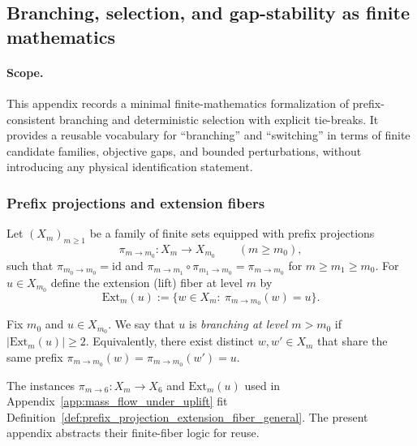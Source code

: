 \subsection{Branching, selection, and gap-stability as finite mathematics}
\label{app:branching_selection_rigidity}

\paragraph{Scope.}
\MathTag This appendix records a minimal finite-mathematics formalization of
prefix-consistent branching and deterministic selection with explicit tie-breaks.
It provides a reusable vocabulary for ``branching'' and ``switching'' in terms of
finite candidate families, objective gaps, and bounded perturbations, without introducing
any physical identification statement.

\subsubsection{Prefix projections and extension fibers}
\label{subsec:branching_prefix_fibers}

\begin{definition}\label{def:prefix_projection_extension_fiber_general}
Let $(X_m)_{m\ge 1}$ be a family of finite sets equipped with prefix projections
\[
\pi_{m\to m_0}:X_m\to X_{m_0}\qquad (m\ge m_0),
\]
such that $\pi_{m_0\to m_0}=\mathrm{id}$ and $\pi_{m\to m_1}\circ \pi_{m_1\to m_0}=\pi_{m\to m_0}$ for $m\ge m_1\ge m_0$.
For $u\in X_{m_0}$ define the extension (lift) fiber at level $m$ by
\[
\mathrm{Ext}_m(u):=\{w\in X_m:\ \pi_{m\to m_0}(w)=u\}.
\]
\end{definition}

\begin{definition}\label{def:branching_at_prefix}
Fix $m_0$ and $u\in X_{m_0}$.
We say that $u$ is \emph{branching at level $m>m_0$} if $|\mathrm{Ext}_m(u)|\ge 2$.
Equivalently, there exist distinct $w,w'\in X_m$ that share the same prefix $\pi_{m\to m_0}(w)=\pi_{m\to m_0}(w')=u$.
\end{definition}

\begin{remark}\label{rem:branching_relation_to_mass_flow_fibers}
The instances $\pi_{m\to 6}:X_m\to X_6$ and $\mathrm{Ext}_m(u)$ used in Appendix~\ref{app:mass_flow_under_uplift}
fit Definition~\ref{def:prefix_projection_extension_fiber_general}.
The present appendix abstracts their finite-fiber logic for reuse.
\end{remark}

